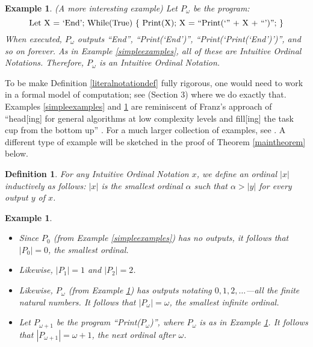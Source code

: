 \documentclass[runningheads]{llncs}
\newtheorem{myexample}[mytheorem]{Example}
\newtheorem{mydefinition}[mytheorem]{Definition}
\begin{document}
\begin{myexample}
\label{omegaexample}
(A more interesting example)
    Let $P_\omega$ be the program:
    \[
        \mbox{\normalfont Let X = `End';
        While(True) \{ Print(X); X = ``Print(`'' + X + ``')''; \}}
    \]
    When executed, $P_\omega$ outputs ``End'', ``Print(`End')'',
    ``Print(`Print(`End')')'', and so on forever. As
    in Example \ref{simpleexamples}, all of these are Intuitive Ordinal Notations.
    Therefore, $P_\omega$ is an Intuitive Ordinal Notation.
\end{myexample}

To be make Definition \ref{literalnotationdef} fully rigorous, one would need
to work in a formal model of computation; see \cite{alexander2019measuring} (Section 3)
where we do exactly that.
Examples \ref{simpleexamples} and \ref{omegaexample} are reminiscent
of Franz's approach of ``head[ing] for general algorithms at low complexity levels
and fill[ing] the task cup from the bottom up'' \cite{franz2015toward}.
For a much larger collection of examples, see \cite{github}.
A different type of example will be sketched in the proof of Theorem
\ref{maintheorem} below.

\begin{mydefinition}
    For any Intuitive Ordinal Notation $x$, we define an ordinal $|x|$
    inductively as follows: $|x|$ is the smallest ordinal $\alpha$
    such that $\alpha>|y|$ for every output $y$ of $x$.
\end{mydefinition}

\begin{myexample}
    \begin{itemize}
        \item
        Since $P_0$ (from Example \ref{simpleexamples}) has no outputs,
        it follows that $|P_0|=0$, the smallest ordinal.
        \item
        Likewise, $|P_1|=1$ and $|P_2|=2$.
        \item
        Likewise, $P_\omega$ (from Example \ref{omegaexample}) has outputs
        notating $0, 1, 2, \ldots$---all the finite natural numbers. It follows
        that $|P_\omega|=\omega$, the smallest
        infinite ordinal.
        \item
        Let $P_{\omega+1}$ be the program ``Print($P_\omega$)'',
        where $P_\omega$ is as in Example \ref{omegaexample}.
        It follows that $|P_{\omega+1}|=\omega+1$, the next ordinal after
        $\omega$.
    \end{itemize}
\end{myexample}
\end{document}
